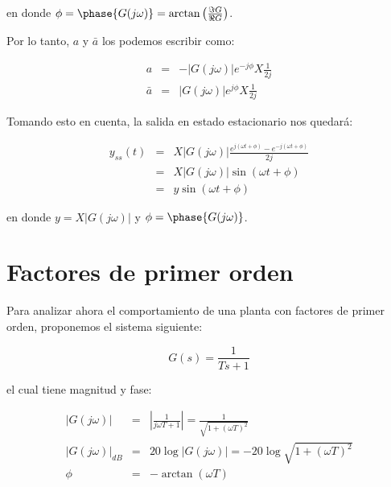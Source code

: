    en donde $\phi = \phase{G(j \omega)} = \arctan{\left( \frac{\Im{G}}{\Re{G}} \right)}$.

    Por lo tanto, $a$ y $\bar{a}$ los podemos escribir como:

    \begin{eqnarray*}
        a & = & - \left| G(j \omega) \right| e^{-j \phi} X \frac{1}{2j} \\
        \bar{a} & = & \left| G(j \omega) \right| e^{j \phi} X \frac{1}{2j}
    \end{eqnarray*}

    Tomando esto en cuenta, la salida en estado estacionario nos quedará:

    \begin{eqnarray*}
        y_{ss}(t) & = & X \left| G(j \omega) \right| \frac{e^{j(\omega t + \phi)} - e^{-j(\omega t + \phi)}}{2j} \\
        & = & X \left| G(j \omega) \right| \sin{(\omega t + \phi)} \\
        & = & y \sin{(\omega t + \phi)}
    \end{eqnarray*}

    en donde $y = X \left| G(j \omega) \right|$ y $\phi = \phase{G(j \omega)}$.


    \newpage
    \section{Factores de primer orden}
        Para analizar ahora el comportamiento de una planta con factores de primer orden, proponemos el sistema siguiente:

        \begin{equation*}
            G(s) = \frac{1}{Ts + 1}
        \end{equation*}

        el cual tiene magnitud y fase:

        \begin{eqnarray*}
            \left| G(j \omega) \right| & = & \left| \frac{1}{j \omega T + 1} \right| = \frac{1}{\sqrt{1 + (\omega T)^2}} \\
            \left| G(j \omega) \right|_{dB} & = & 20 \log{\left| G(j \omega) \right|} = -20 \log{\sqrt{1 + (\omega T)^2}} \\
            \phi & = & - \arctan{(\omega T)}
        \end{eqnarray*}

